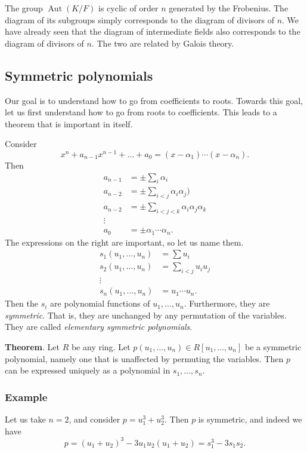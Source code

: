 \documentclass[11pt]{article}
\begin{document}
\begin{enumerate}
The group \(\operatorname{Aut}(K/F)\) is cyclic of order \(n\) generated by the Frobenius.
The diagram of its subgroups simply corresponds to the diagram of divisors of \(n\).
We have already seen that the diagram of intermediate fields also corresponds to the diagram of divisors of \(n\).
The two are related by Galois theory.
\end{enumerate}
\subsection{Symmetric polynomials}
\label{sec:org68e742e}
Our goal is to understand how to go from coefficients to roots.
Towards this goal, let us first understand how to go from roots to coefficients.
This leads to a theorem that is important in itself.

Consider
\[ x^{n} + a_{n-1}x^{n-1} + \dots + a_{0} = (x-\alpha_1) \cdots (x-\alpha_n).\]
Then
\begin{align*}
a_{n-1} &= \pm \sum_{i} \alpha_{i}\\
a_{n-2} &= \pm \sum_{i < j} \alpha_{i} \alpha_{j})\\
a_{n-2} &= \pm \sum_{i<j<k} \alpha_{i}\alpha_{j}\alpha_{k}\\
\vdots\\
a_{0} &= \pm \alpha_{1} \cdots \alpha_{n}.
\end{align*}
The expressions on the right are important, so let us name them.
\begin{align*}
 s_{1}(u_{1}, \dots, u_{n}) &= \sum u_{i}\\
 s_{2}(u_{1}, \dots,u_{n}) &= \sum_{i<j}u_{i}u_{j}\\
\vdots \\
s_{n}(u_{1}, \dots, u_{n}) &= u_{1} \cdots u_{n}.
\end{align*}
Then the \(s_i\) are polynomial functions of \(u_{1}, \dots, u_{n}\).
Furthermore, they are \emph{symmetric}.
That is, they are unchanged by any permutation of the variables.
They are called \emph{elementary symmetric polynomials}.

\textbf{Theorem}. Let \(R\) be any ring.  Let \(p(u_{1}, \dots, u_{n}) \in R[u_{1}, \dots, u_{n}]\) be a symmetric polynomial, namely one that is unaffected by permuting the variables.  Then \(p\) can be expressed uniquely as a polynomial in \(s_{1}, \dots, s_{n}\).
\subsubsection{Example}
\label{sec:org15496c6}
Let us take \(n = 2\), and consider \(p = u_{1}^3 + u_{2}^3\).
Then \(p\) is symmetric, and indeed we have
\[ p = (u_{1}+u_{2})^3 - 3u_{1}u_{2}(u_{1}+u_{2}) = s_{1}^3-3s_{1}s_{2}.\]
\end{document}
